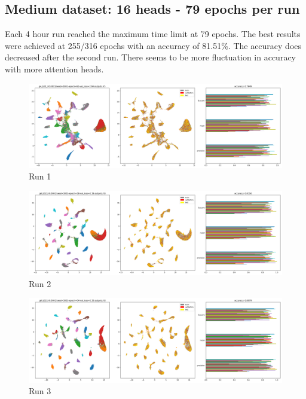 \documentclass{article}
\begin{document}
\clearpage

\subsection*{Medium dataset: 16 heads - 79 epochs per run}
Each 4 hour run reached the maximum time limit at 79 epochs. The best results were achieved at 255/316 epochs with an accuracy of 81.51\%. The accuracy does decreased after the second run. There seems to be more fluctuation in accuracy with more attention heads. 


\begin{figure}[h!]
  \includegraphics[width=\linewidth]{new_journal/figures/experiments/roznet_multi/16_heads/run1.png}
  \caption{Run 1}
\end{figure}

\begin{figure}[h!]
  \includegraphics[width=\linewidth]{new_journal/figures/experiments/roznet_multi/16_heads/run2.png}
  \caption{Run 2}
\end{figure}

\begin{figure}[h!]
  \includegraphics[width=\linewidth]{new_journal/figures/experiments/roznet_multi/16_heads/run3.png}
  \caption{Run 3}
\end{figure}
\end{document}
